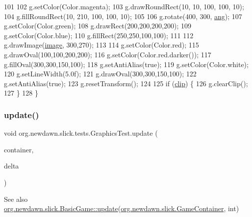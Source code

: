 \begin{DoxyCode}
101         
102         g.setColor(Color.magenta);
103         g.drawRoundRect(10, 10, 100, 100, 10);
104         g.fillRoundRect(10, 210, 100, 100, 10);
105         
106         g.rotate(400, 300, \mbox{\hyperlink{classorg_1_1newdawn_1_1slick_1_1tests_1_1_graphics_test_a4ed9f283437a082c3e14f94968f7cf70}{ang}});
107         g.setColor(Color.green);
108         g.drawRect(200,200,200,200);
109         g.setColor(Color.blue);
110         g.fillRect(250,250,100,100);
111 
112         g.drawImage(\mbox{\hyperlink{classorg_1_1newdawn_1_1slick_1_1tests_1_1_graphics_test_a425fce4f6eef7e14bbe291e64d604fdf}{image}}, 300,270);
113         
114         g.setColor(Color.red);
115         g.drawOval(100,100,200,200);
116         g.setColor(Color.red.darker());
117         g.fillOval(300,300,150,100);
118         g.setAntiAlias(\textcolor{keyword}{true});
119         g.setColor(Color.white);
120         g.setLineWidth(5.0f);
121         g.drawOval(300,300,150,100);
122         g.setAntiAlias(\textcolor{keyword}{true});
123         g.resetTransform();
124         
125         \textcolor{keywordflow}{if} (\mbox{\hyperlink{classorg_1_1newdawn_1_1slick_1_1tests_1_1_graphics_test_a45883b25988c6ce31f644d342ab168f3}{clip}}) \{
126             g.clearClip();
127         \}
128     \}
\end{DoxyCode}
\mbox{\label{classorg_1_1newdawn_1_1slick_1_1tests_1_1_graphics_test_aba6467ff04e7fa1f1ae8930ab9d6949a}} 
\subsubsection{\texorpdfstring{update()}{update()}}
{\footnotesize\ttfamily void org.\+newdawn.\+slick.\+tests.\+Graphics\+Test.\+update (\begin{DoxyParamCaption}\item[{\mbox{\hyperlink{classorg_1_1newdawn_1_1slick_1_1_game_container}{Game\+Container}}}]{container,  }\item[{int}]{delta }\end{DoxyParamCaption})\hspace{0.3cm}{\ttfamily [inline]}}

\begin{DoxySeeAlso}{See also}
\mbox{\hyperlink{classorg_1_1newdawn_1_1slick_1_1_basic_game_acfe6fa05aef83bff1631af91a3e4bd20}{org.\+newdawn.\+slick.\+Basic\+Game\+::update}}(\mbox{\hyperlink{classorg_1_1newdawn_1_1slick_1_1_game_container}{org.\+newdawn.\+slick.\+Game\+Container}}, int) 
\end{DoxySeeAlso}


